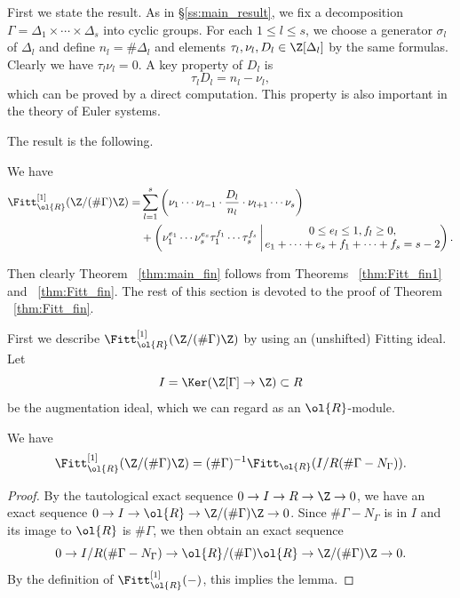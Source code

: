 First we state the result.
As in \S\ref{ss:main_result}, we fix a decomposition $\Gamma = \Delta_1 \times \cdots \times \Delta_s$ into cyclic groups.
For each $1 \leq l \leq s$, we choose a generator $\sigma_l$ of $\Delta_l$ and define $n_l = \# \Delta_l$ and elements $\tau_l, \nu_l, D_l \in \Z[\Delta_l]$ by the same formulas.
Clearly we have $\tau_l \nu_l = 0$.
A key property of $D_l$ is 
\begin{equation}\label{eq:D_key}
\tau_l D_l = n_l - \nu_l,
\end{equation}
which can be proved by a direct computation.
This property is also important in the theory of Euler systems.

The result is the following.

\begin{thm}\label{thm:Fitt_fin}
We have
\begin{align}
\Fitt^{[1]}_{\ol{R}}(\Z/ (\#\Gamma) \Z)
= & \sum_{l=1}^s \left( \nu_1 \cdots \nu_{l-1} \cdot \frac{D_l}{n_l} \cdot \nu_{l+1} \cdots \nu_s \right) \\
& + \left(\nu_1^{e_1} \cdots \nu_s^{e_s} \tau_1^{f_1} \cdots \tau_s^{f_s} \, \middle| \, \begin{matrix} 0 \leq e_l \leq 1, f_l \geq 0, \\ e_1 + \cdots + e_s + f_1 + \cdots + f_s = s- 2 \end{matrix} \right).
\end{align}
\end{thm}

Then clearly Theorem ~\ref{thm:main_fin} follows from Theorems ~\ref{thm:Fitt_fin1} and ~\ref{thm:Fitt_fin}.
The rest of this section is devoted to the proof of Theorem ~\ref{thm:Fitt_fin}.

First we describe $\Fitt^{[1]}_{\ol{R}}(\Z/ (\#\Gamma) \Z)$ by using an (unshifted) Fitting ideal.
Let 
\[
I = \Ker(\Z[\Gamma] \to \Z) \subset R
\]
 be the augmentation ideal, which we can regard as an $\ol{R}$-module.

\begin{lemm}\label{lem:Fitt1}
We have
\[
\Fitt^{[1]}_{\ol{R}}(\Z/ (\#\Gamma) \Z) 
 = (\# \Gamma)^{-1} \Fitt_{\ol{R}}(I/R(\# \Gamma - N_{\Gamma})).
\]
\end{lemm}

\begin{proof}
By the tautological exact sequence $0 \to I \to R \to \Z \to 0$, we have an exact sequence $0 \to I \to \ol{R} \to \Z/(\# \Gamma)\Z \to 0$.
Since $\# \Gamma - N_{\Gamma}$ is in $I$ and its image to $\ol{R}$ is $\# \Gamma$, we then obtain an exact sequence
\[
0 \to I/R (\# \Gamma - N_{\Gamma}) \to \ol{R}/ (\# \Gamma) \ol{R} \to \Z/(\# \Gamma)\Z \to 0.
\]
By the definition of $\Fitt_{\ol{R}}^{[1]}(-)$, this implies the lemma.
\end{proof}

